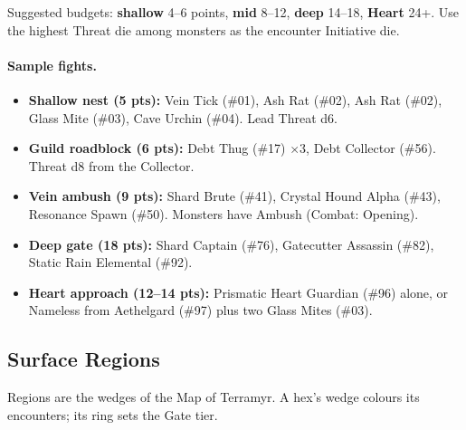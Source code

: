 \vspace{2mm}
Suggested budgets: \textbf{shallow} 4--6 points, \textbf{mid} 8--12, \textbf{deep} 14--18, \textbf{Heart} 24+.
Use the highest Threat die among monsters as the encounter Initiative die.

\paragraph{Sample fights.}
\begin{itemize}
    \item \textbf{Shallow nest (5 pts):} Vein Tick (\#01), Ash Rat (\#02), Ash Rat (\#02), Glass Mite (\#03), Cave Urchin (\#04). Lead Threat d6.
    \item \textbf{Guild roadblock (6 pts):} Debt Thug (\#17) $\times$3, Debt Collector (\#56). Threat d8 from the Collector.
    \item \textbf{Vein ambush (9 pts):} Shard Brute (\#41), Crystal Hound Alpha (\#43), Resonance Spawn (\#50). Monsters have Ambush (Combat: Opening).
    \item \textbf{Deep gate (18 pts):} Shard Captain (\#76), Gatecutter Assassin (\#82), Static Rain Elemental (\#92).
    \item \textbf{Heart approach (12--14 pts):} Prismatic Heart Guardian (\#96) alone, or Nameless from Aethelgard (\#97) plus two Glass Mites (\#03).
\end{itemize}

\subsection{Surface Regions}

Regions are the wedges of the Map of Terramyr. A hex's wedge colours its encounters; its ring sets the Gate tier.

